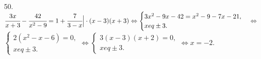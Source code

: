 50. $\cfrac{3x}{x+3}-\cfrac{42}{x^2-9}=1+\cfrac{7}{3-x}\Big|\cdot(x-3)(x+3)\Leftrightarrow\begin{cases}3x^2-9x-42=x^2-9-7x-21,\\x
eq\pm3.\end{cases}
\Leftrightarrow$\\$\begin{cases}2(x^2-x-6)=0,\\x
eq\pm3.\end{cases}\Leftrightarrow\begin{cases}3(x-3)(x+2)=0,\\x
eq\pm3.\end{cases}\Leftrightarrow x=-2.$\\
